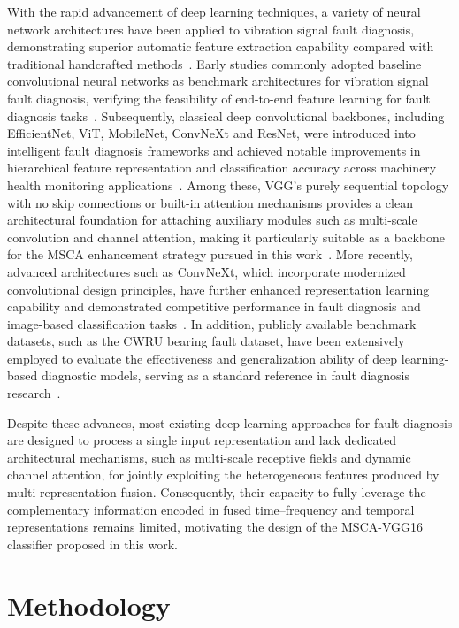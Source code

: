 \documentclass[pdflatex,sn-mathphys-num]{sn-jnl}
\theoremstyle{thmstyleone}%
\theoremstyle{thmstyletwo}%
\theoremstyle{thmstylethree}%
\begin{document}
With the rapid advancement of deep learning techniques, a variety of neural network architectures have been applied to vibration signal fault diagnosis, demonstrating superior automatic feature extraction capability compared with traditional handcrafted methods~\cite{JIANG2026113823,COSTA2026113711,WEN2025114614}. Early studies commonly adopted baseline convolutional neural networks as benchmark architectures for vibration signal fault diagnosis, verifying the feasibility of end-to-end feature learning for fault diagnosis tasks~\cite{HE2020542}. Subsequently, classical deep convolutional backbones, including EfficientNet, ViT, MobileNet, ConvNeXt and ResNet, were introduced into intelligent fault diagnosis frameworks and achieved notable improvements in hierarchical feature representation and classification accuracy across machinery health monitoring applications~\cite{10663388,DUAN2026122469,10048773}. Among these, VGG's purely sequential topology with no skip connections or built-in attention mechanisms provides a clean architectural foundation for attaching auxiliary modules such as multi-scale convolution and channel attention, making it particularly suitable as a backbone for the MSCA enhancement strategy pursued in this work~\cite{WANG2026105996}. More recently, advanced architectures such as ConvNeXt, which incorporate modernized convolutional design principles, have further enhanced representation learning capability and demonstrated competitive performance in fault diagnosis and image-based classification tasks~\cite{10980179}. In addition, publicly available benchmark datasets, such as the CWRU bearing fault dataset, have been extensively employed to evaluate the effectiveness and generalization ability of deep learning-based diagnostic models, serving as a standard reference in fault diagnosis research~\cite{SMITH2015100}.

Despite these advances, most existing deep learning approaches for fault diagnosis are designed to process a single input representation and lack dedicated architectural mechanisms, such as multi-scale receptive fields and dynamic channel attention, for jointly exploiting the heterogeneous features produced by multi-representation fusion. Consequently, their capacity to fully leverage the complementary information encoded in fused time--frequency and temporal representations remains limited, motivating the design of the MSCA-VGG16 classifier proposed in this work.

\section{Methodology}
\label{section3}
\end{document}
